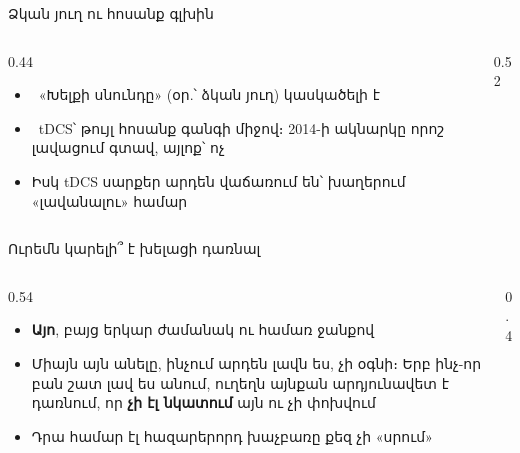 \begin{frame}{Ձկան յուղ ու հոսանք գլխին}
  \begin{columns}[T]
    \begin{column}{0.44\textwidth}
      \begin{itemize}
        \item {}\ «Խելքի սնունդը» (օր.՝ ձկան յուղ) կասկածելի է
        \item<2-> \ tDCS՝ թույլ հոսանք գանգի միջով։ 2014-ի ակնարկը որոշ լավացում գտավ, այլոք՝ ոչ
        \item<3-> Իսկ tDCS սարքեր արդեն վաճառում են՝ խաղերում «լավանալու» համար
      \end{itemize}
    \end{column}
    \begin{column}{0.52\textwidth}
    \end{column}
  \end{columns}
\end{frame}

\begin{frame}{Ուրեմն կարելի՞ է խելացի դառնալ}
  \begin{columns}[c]
    \begin{column}{0.54\textwidth}
      \begin{itemize}
        \item \textbf{Այո}, բայց երկար ժամանակ ու համառ ջանքով
        \item<2-> Միայն այն անելը, ինչում արդեն լավն ես, չի օգնի։ Երբ ինչ-որ բան շատ լավ ես անում, ուղեղն այնքան արդյունավետ է դառնում, որ \textbf{չի էլ նկատում} այն ու չի փոխվում
        \item<3-> Դրա համար էլ հազարերորդ խաչբառը քեզ չի «սրում» 
      \end{itemize}
    \end{column}
    \begin{column}{0.4\textwidth}
      \centering
    \end{column}
  \end{columns}
\end{frame}
